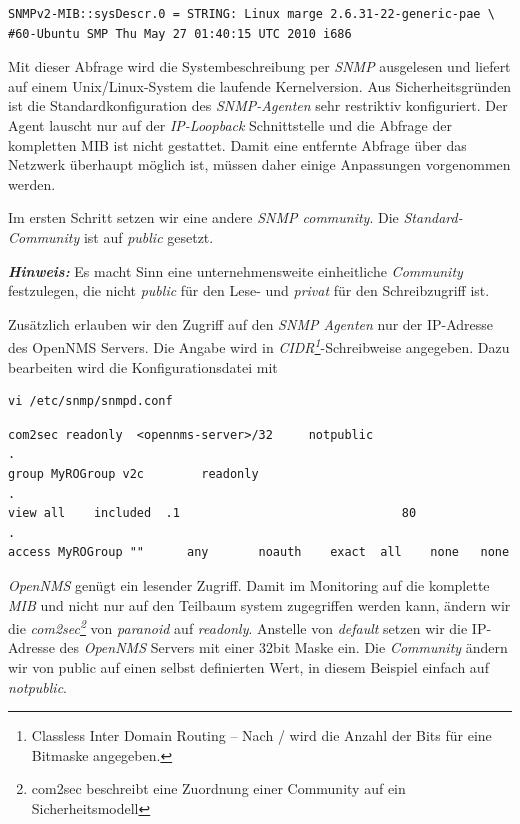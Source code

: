\begin{lstlisting}[numbers=none]
SNMPv2-MIB::sysDescr.0 = STRING: Linux marge 2.6.31-22-generic-pae \
#60-Ubuntu SMP Thu May 27 01:40:15 UTC 2010 i686
\end{lstlisting}

Mit dieser Abfrage wird die Systembeschreibung per \emph{SNMP} ausgelesen und liefert auf einem Unix/Linux-System die laufende Kernelversion.
Aus Sicherheitsgründen ist die Standardkonfiguration des \emph{SNMP-Agenten} sehr restriktiv konfiguriert. Der Agent lauscht nur auf der \emph{IP-Loopback} Schnittstelle und die Abfrage der kompletten MIB ist nicht gestattet. Damit eine entfernte Abfrage über das Netzwerk überhaupt möglich ist, müssen daher einige Anpassungen vorgenommen werden.

Im ersten Schritt setzen wir eine andere \emph{SNMP community}. Die \emph{Standard-Community} ist auf \emph{public} gesetzt. 

\textbf{\textit{Hinweis:}} Es macht Sinn eine unternehmensweite einheitliche \emph{Community} festzulegen, die nicht \emph{public} für den Lese- und \emph{privat} für den Schreibzugriff ist.

Zusätzlich erlauben wir den Zugriff auf den \emph{SNMP Agenten} nur der IP-Adresse des OpenNMS Servers. Die Angabe wird in \emph{CIDR\footnote{Classless Inter Domain Routing – Nach / wird die Anzahl der Bits für eine Bitmaske angegeben.}}-Schreibweise angegeben. Dazu bearbeiten wird die Konfigurationsdatei mit

\begin{lstlisting}[numbers=none]
vi /etc/snmp/snmpd.conf
\end{lstlisting}

\begin{lstlisting}
com2sec readonly  <opennms-server>/32     notpublic
.
group MyROGroup v2c        readonly
.
view all    included  .1                               80
.
access MyROGroup ""      any       noauth    exact  all    none   none
\end{lstlisting}

\emph{OpenNMS} genügt ein lesender Zugriff. Damit im Monitoring auf die komplette \emph{MIB} und nicht nur auf den Teilbaum system zugegriffen werden kann, ändern wir die \emph{com2sec\footnote{com2sec beschreibt eine Zuordnung einer Community auf ein Sicherheitsmodell}} von \emph{paranoid} auf \emph{readonly}. Anstelle von \emph{default} setzen wir die IP-Adresse des \emph{OpenNMS} Servers mit einer 32bit Maske ein. Die \emph{Community} ändern wir von public auf einen selbst definierten Wert, in diesem Beispiel einfach auf \emph{notpublic}.

